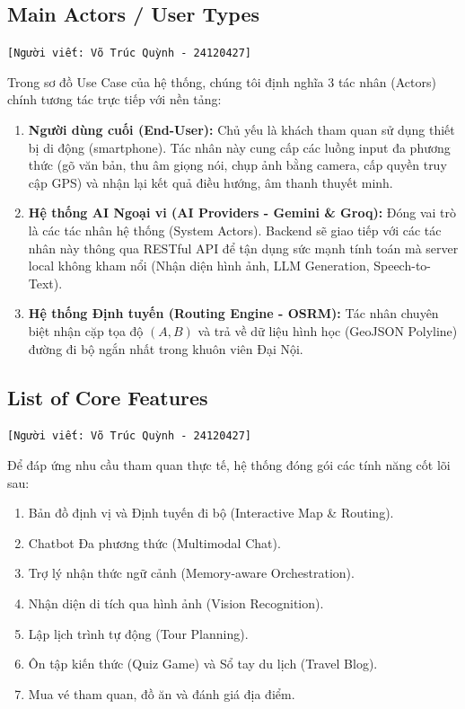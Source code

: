 \subsection{Main Actors / User Types}
\texttt{[Người viết: Võ Trúc Quỳnh - 24120427]}

Trong sơ đồ Use Case của hệ thống, chúng tôi định nghĩa 3 tác nhân (Actors) chính tương tác trực tiếp với nền tảng:

\begin{enumerate}
    \item \textbf{Người dùng cuối (End-User):} Chủ yếu là khách tham quan sử dụng thiết bị di động (smartphone). Tác nhân này cung cấp các luồng input đa phương thức (gõ văn bản, thu âm giọng nói, chụp ảnh bằng camera, cấp quyền truy cập GPS) và nhận lại kết quả điều hướng, âm thanh thuyết minh.
    \item \textbf{Hệ thống AI Ngoại vi (AI Providers - Gemini \& Groq):} Đóng vai trò là các tác nhân hệ thống (System Actors). Backend sẽ giao tiếp với các tác nhân này thông qua RESTful API để tận dụng sức mạnh tính toán mà server local không kham nổi (Nhận diện hình ảnh, LLM Generation, Speech-to-Text).
    \item \textbf{Hệ thống Định tuyến (Routing Engine - OSRM):} Tác nhân chuyên biệt nhận cặp tọa độ $(A, B)$ và trả về dữ liệu hình học (GeoJSON Polyline) đường đi bộ ngắn nhất trong khuôn viên Đại Nội.
\end{enumerate}

\subsection{List of Core Features}
\texttt{[Người viết: Võ Trúc Quỳnh - 24120427]}

Để đáp ứng nhu cầu tham quan thực tế, hệ thống đóng gói các tính năng cốt lõi sau:
\begin{enumerate}
    \item Bản đồ định vị và Định tuyến đi bộ (Interactive Map \& Routing).
    \item Chatbot Đa phương thức (Multimodal Chat).
    \item Trợ lý nhận thức ngữ cảnh (Memory-aware Orchestration).
    \item Nhận diện di tích qua hình ảnh (Vision Recognition).
    \item Lập lịch trình tự động (Tour Planning).
    \item Ôn tập kiến thức (Quiz Game) và Sổ tay du lịch (Travel Blog).
    \item Mua vé tham quan, đồ ăn và đánh giá địa điểm.
\end{enumerate}

